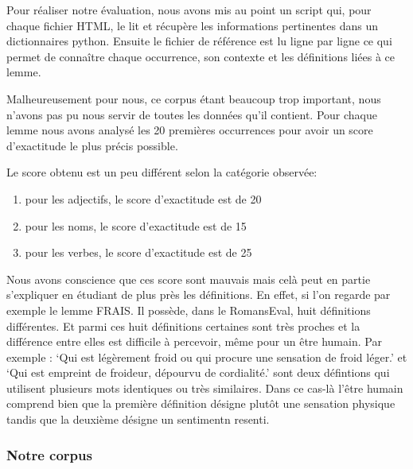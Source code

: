 Pour réaliser notre évaluation, nous avons mis au point un script qui, pour 
chaque fichier HTML, le lit et récupère les informations pertinentes dans un 
dictionnaires python. Ensuite le fichier de référence est lu ligne par ligne 
ce qui permet de connaître chaque occurrence, son contexte et les définitions 
liées à ce lemme.

Malheureusement pour nous, ce corpus étant beaucoup trop important, nous 
n'avons pas pu nous servir de toutes les données qu'il contient. Pour chaque 
lemme nous avons analysé les 20 premières occurrences pour avoir un score 
d'exactitude le plus précis possible.

Le score obtenu est un peu différent selon la catégorie observée:

\begin{enumerate}
 \item pour les adjectifs, le score d'exactitude est de 20%
 \item pour les noms, le score d'exactitude est de 15%
 \item pour les verbes, le score d'exactitude est de 25%
\end{enumerate}

Nous avons conscience que ces score sont mauvais mais celà peut en partie 
s'expliquer en étudiant de plus près les définitions. En effet, si l'on regarde 
par exemple le lemme FRAIS. Il possède, dans le RomansEval, huit définitions 
différentes. Et parmi ces huit définitions certaines sont très proches et la 
différence entre elles est difficile à percevoir, même pour un être humain. Par 
exemple : `Qui est légèrement froid ou qui procure une sensation de froid 
léger.' et `Qui est empreint de froideur, dépourvu de cordialité.' sont deux 
défintions qui utilisent plusieurs mots identiques ou très similaires. Dans ce 
cas-là l'être humain comprend bien que la première définition désigne plutôt 
une sensation physique tandis que la deuxième désigne un sentimentn resenti.

\subsubsection{Notre corpus}


